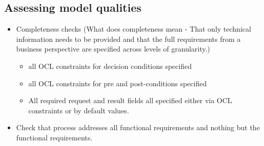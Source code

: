 
\subsection{Assessing model qualities}



\begin{itemize}
  \item Completeness checks
(What does completeness mean - That only technical information needs to be provided and that the full requirements
from a business perspective are specified across levels of granularity.)
    \begin{itemize}
     \item all OCL constraints for decision conditions specified
     \item all OCL constraints for pre and post-conditions specified
     \item All required request and result fields all specified either via OCL constraints 
	or by default values.
    \end{itemize}
  \item Check that process addresses all functional requirements and nothing but the functional requirements.
\end{itemize}

